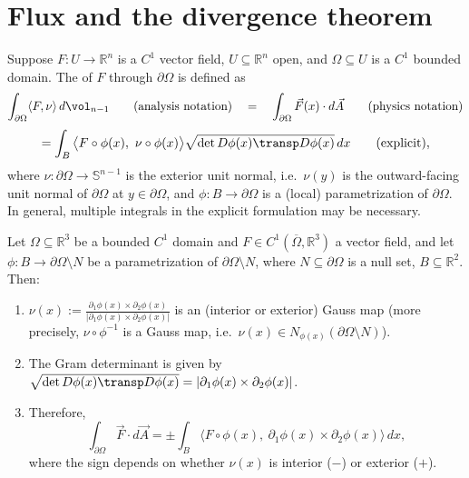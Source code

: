 
\section{Flux and the divergence theorem}
\label{sec:flux_divergence_theorem}

\begin{definition}[Flux]
\label{def:flux}
Suppose $F : U \to \mathbb{R}^n$ is a $C^1$ vector field, $U \subseteq \mathbb{R}^n$ open, and
$\Omega \subseteq U$ is a $C^1$ bounded domain. The   of $F$
through $\partial\Omega$ is defined as
\[\int_{\partial\Omega} \langle F,\nu\rangle\,d\vol_{n-1} \qquad \text{(analysis notation)}
  \quad = \quad \int_{\partial\Omega} \vec F(x)\cdot d\vec A \qquad \text{(physics notation)}\]
\[= \int_B \big\langle F\circ\phi(x),\ \nu\circ\phi(x)\big\rangle
   \sqrt{\det D\phi(x)\transp D\phi(x)}\,dx \qquad \text{(explicit)},\]
where $\nu : \partial\Omega \to \mathbb{S}^{n-1}$ is the exterior unit normal, i.e.\ $\nu(y)$
is the outward-facing unit normal of $\partial\Omega$ at $y \in \partial\Omega$, and
$\phi : B \to \partial\Omega$ is a (local) parametrization of $\partial\Omega$. In general,
multiple integrals in the explicit formulation may be necessary.
\end{definition}

\begin{proposition}
\label{prop:flux_r3}
Let $\Omega \subseteq \mathbb{R}^3$ be a bounded $C^1$ domain and $F \in
C^1(\overline\Omega,\mathbb{R}^3)$ a vector field, and let $\phi : B \to \partial\Omega
\setminus N$ be a parametrization of $\partial\Omega\setminus N$, where $N \subseteq
\partial\Omega$ is a null set, $B \subseteq \mathbb{R}^2$. Then:
\begin{enumerate}[label=\textbf{(\alph*)}]
  \item $\displaystyle\nu(x) := \frac{\partial_1\phi(x)\times\partial_2\phi(x)}
    {\lvert\partial_1\phi(x)\times\partial_2\phi(x)\rvert}$ is an (interior or exterior) Gauss
    map (more precisely, $\nu\circ\phi^{-1}$ is a Gauss map, i.e.\
    $\nu(x) \in N_{\phi(x)}(\partial\Omega\setminus N)$).
  \item The Gram determinant is given by
    $\sqrt{\det D\phi(x)\transp D\phi(x)} = \lvert\partial_1\phi(x)\times\partial_2\phi(x)
    \rvert$.
  \item Therefore,
    \[\int_{\partial\Omega} \vec F\cdot d\vec A = \pm\int_B \big\langle F\circ\phi(x),\
      \partial_1\phi(x)\times\partial_2\phi(x)\big\rangle\,dx,\]
    where the sign depends on whether $\nu(x)$ is interior ($-$) or exterior ($+$).
\end{enumerate}
\end{proposition}

